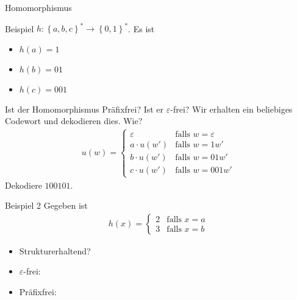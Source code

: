 \begin{frame}{Homomorphismus}
    \begin{exampleblock}{Beispiel}
        $h: \left\{ a,b,c \right\}^* \rightarrow \left\{ 0,1 \right\}^*$. Es ist
        \begin{itemize}
            \item $h\left( a \right) = 1$
            \item $h\left( b \right) = 01$
            \item $h\left( c \right) = 001$
        \end{itemize}
        \pause
        Ist der Homomorphismus Präfixfrei? Ist er $\varepsilon$-frei?
        \pause
        Wir erhalten ein beliebiges Codewort und dekodieren dies. Wie?
        \begin{align*}
            u\left( w \right) = \begin{cases} 
                \varepsilon & \text{falls } w = \varepsilon\\
                a\cdot u\left( w' \right) & \text{falls } w = 1w'\\
                b\cdot u\left( w' \right) & \text{falls } w = 01w'\\
                c\cdot u\left( w' \right) & \text{falls } w = 001w'
            \end{cases}
        \end{align*}
        \pause
        Dekodiere $100101$.
    \end{exampleblock}
\end{frame}
\begin{frame}{Beispiel 2}
    Gegeben ist
    \begin{align*}
        h\left( x \right) = \begin{cases}
            2 & \text{falls } x = a\\
            3 & \text{falls } x = b
        \end{cases}
    \end{align*}
    \begin{itemize}
        \item Strukturerhaltend?\\
        \item $\varepsilon$-frei: 
        \item Präfixfrei: 
    \end{itemize}
\end{frame}
